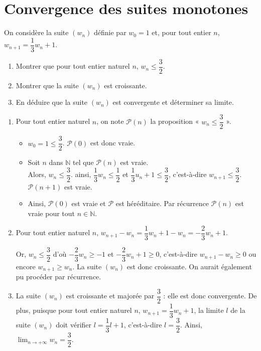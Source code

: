 \documentclass[11pt,fleqn, openany]{book} %
\begin{document}
\section*{Convergence des suites monotones}

\begin{exercise} On considère la suite $(w_n)$ définie par $w_0=1$ et, pour tout entier $n$, $w_{n+1}=\dfrac{1}{3}w_n+1$. 
\begin{enumerate}
\item Montrer que pour tout entier naturel $n$, $w_n\leqslant \dfrac{3}{2}$.
\item Montrer que la suite $(w_n)$ est croissante.
\item En déduire que la suite $(w_n)$ est convergente et déterminer sa limite.
\end{enumerate}\end{exercise}

\begin{solution}\hspace{0pt}
\begin{enumerate}
\item Pour tout entier naturel $n$, on note $\mathcal{P}(n)$ la proposition « $w_n\leqslant \dfrac{3}{2}$ ».

\begin{itemize}
\item $w_0= 1\leqslant \dfrac{3}{2}$. $\mathcal{P}(0)$ est donc vraie.
\item Soit $n$ dans $\mathbb{N}$ tel que $\mathcal{P}(n)$ est vraie. \\
Alors, $w_n \leqslant \dfrac{3}{2}$. ainsi, $\dfrac{1}{3}w_n \leqslant \dfrac{1}{2}$ et $\dfrac{1}{3}u_n+1\leqslant \dfrac{3}{2}$, c'est-à-dire $w_{n+1} \leqslant \dfrac{3}{2}$. $\mathcal{P}(n+1)$ est vraie.
\item Ainsi, $\mathcal{P}(0)$ est vraie et $\mathcal{P}$ est héréditaire. Par récurrence $\mathcal{P}(n)$ est vraie pour tout $n\in\mathbb{N}$.
\end{itemize}

\item Pour tout entier naturel $n$, $w_{n+1}-w_n=\dfrac{1}{3}w_n+1-w_n=-\dfrac{2}{3}w_n+1$.

Or, $w_n \leqslant \dfrac{3}{2}$ d'où $-\dfrac{2}{3}w_n \geqslant -1$ et $-\dfrac{2}{3}w_n+1 \geqslant 0$, c'est-à-dire $w_{n+1}-w_n \geqslant 0$ ou encore $w_{n+1} \geqslant w_n$. La suite $(w_n)$ est donc croissante. On aurait également pu procéder par récurrence.

\item La suite $(w_n)$ est croissante et majorée par $\dfrac{3}{2}$ : elle est donc convergente. De plus, puisque pour tout entier naturel $n$, $w_{n+1}=\dfrac{1}{3}w_n +1$, la limite $l$ de la suite $(w_n)$ doit vérifier $l=\dfrac{1}{3}l+1$, c'est-à-dire $l=\dfrac{3}{2}$. Ainsi, $\displaystyle \lim_{n\to +\infty} w_n=\dfrac{3}{2}$.\end{enumerate}\end{solution}
\end{document}
